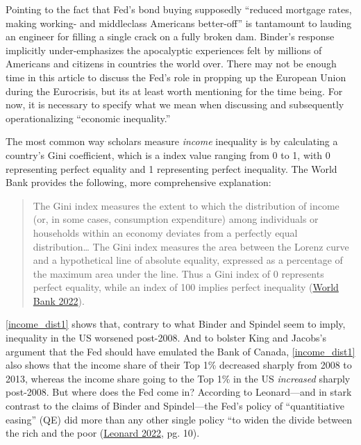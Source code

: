 \documentclass[
  12pt,
]{article}
\begin{document}
Pointing to the fact that Fed's bond buying supposedly ``reduced
mortgage rates, making working- and middleclass Americans better-off''
is tantamount to lauding an engineer for filling a single crack on a
fully broken dam. Binder's response implicitly under-emphasizes the
apocalyptic experiences felt by millions of Americans and citizens in
countries the world over. There may not be enough time in this article
to discuss the Fed's role in propping up the European Union during the
Eurocrisis, but its at least worth mentioning for the time being. For
now, it is necessary to specify what we mean when discussing and
subsequently operationalizing ``economic inequality.''

The most common way scholars measure \emph{income} inequality is by
calculating a country's Gini coefficient, which is a index value ranging
from 0 to 1, with 0 representing perfect equality and 1 representing
perfect inequality. The World Bank provides the following, more
comprehensive explanation:

\begin{quote}
The Gini index measures the extent to which the distribution of income
(or, in some cases, consumption expenditure) among individuals or
households within an economy deviates from a perfectly equal
distribution\ldots{} The Gini index measures the area between the Lorenz
curve and a hypothetical line of absolute equality, expressed as a
percentage of the maximum area under the line. Thus a Gini index of 0
represents perfect equality, while an index of 100 implies perfect
inequality (\protect\hyperlink{ref-worldbank2022}{World Bank 2022}).
\end{quote}

\autoref{income_dist1} shows that, contrary to what Binder and Spindel
seem to imply, inequality in the US worsened post-2008. And to bolster
King and Jacobs's argument that the Fed should have emulated the Bank of
Canada, \autoref{income_dist1} also shows that the income share of their
Top 1\% decreased sharply from 2008 to 2013, whereas the income share
going to the Top 1\% in the US \emph{increased} sharply post-2008. But
where does the Fed come in? According to Leonard---and in stark contrast
to the claims of Binder and Spindel---the Fed's policy of
``quantitiative easing'' (QE) did more than any other single policy ``to
widen the divide between the rich and the poor
(\protect\hyperlink{ref-leonard2022}{Leonard 2022}, pg. 10).
\end{document}
